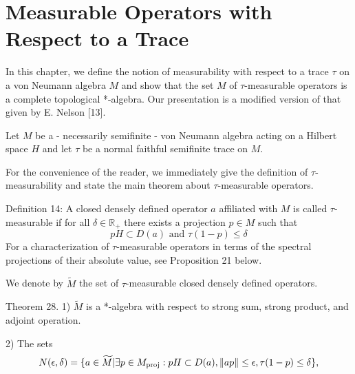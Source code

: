 
% 
\chapter{Measurable Operators with Respect to a Trace}
In this chapter, we define the notion of measurability with respect to a trace $\tau$ on a von Neumann algebra $M$ and show that the set $M$ of $\tau$-measurable operators is a complete topological *-algebra. Our presentation is a modified version of that given by E. Nelson [13].\par
Let $M$ be a - necessarily semifinite - von Neumann algebra acting on a Hilbert space $H$ and let $\tau$ be a normal faithful semifinite trace on $M$.\par
For the convenience of the reader, we immediately give the definition of $\tau$-measurability and state the main theorem about $\tau$-measurable operators.\par
\bigskip
Definition 14: A closed densely defined operator $a$ affiliated with $M$ is called $\tau$-measurable if for all $\delta\in \mathbb{R}_+$ there exists a projection $p\in M$ such that
\[
pH\subset D(a)\text{ and } \tau(1-p)\leq \delta
\]
For a characterization of $\tau$-measurable operators in terms of the spectral projections of their absolute value, see Proposition 21 below.\par
We denote by $\widetilde{M}$ the set of $\tau$-measurable closed densely defined operators.\par
Theorem 28. 1) $\widetilde{M}$ is a *-algebra with respect to strong sum, strong product, and adjoint operation.\par
2) The sets
\[
    N(\epsilon,\delta)=\{a\in \widetilde{M}|\exists p\in M_{\text{proj}}:pH\subset D(a),\norm{ap}\leq \epsilon,\tau(1-p)\leq \delta\},
\]
